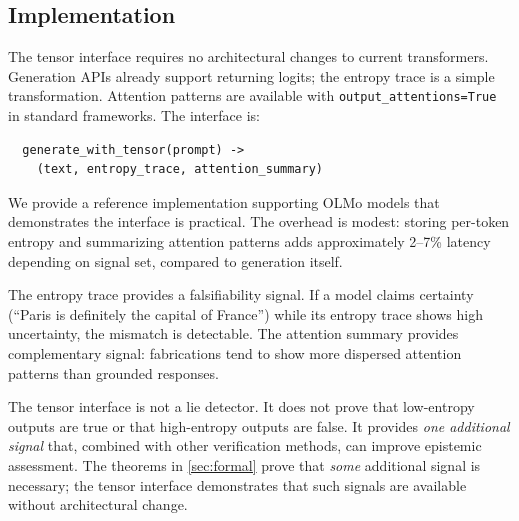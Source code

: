 \subsection{Implementation}

The tensor interface requires no architectural changes to current transformers.
Generation APIs already support returning logits; the entropy trace is a simple
transformation. Attention patterns are available with \texttt{output\_attentions=True}
in standard frameworks. The interface is:

\begin{verbatim}
  generate_with_tensor(prompt) ->
    (text, entropy_trace, attention_summary)
\end{verbatim}

We provide a reference implementation supporting OLMo models that demonstrates
the interface is practical. The overhead is modest: storing per-token entropy
and summarizing attention patterns adds approximately 2--7\% latency depending
on signal set, compared to generation itself.

The entropy trace provides a falsifiability signal. If a model claims certainty
(``Paris is definitely the capital of France'') while its entropy trace shows
high uncertainty, the mismatch is detectable. The attention summary provides
complementary signal: fabrications tend to show more dispersed attention
patterns than grounded responses.

The tensor interface is not a lie detector. It does not prove that low-entropy
outputs are true or that high-entropy outputs are false. It provides \emph{one
additional signal} that, combined with other verification methods, can improve
epistemic assessment. The theorems in \autoref{sec:formal} prove that
\emph{some} additional signal is necessary; the tensor interface demonstrates
that such signals are available without architectural change.

